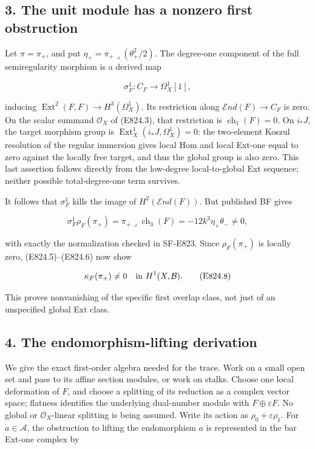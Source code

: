\subsection{3. The unit module has a nonzero first
obstruction}\label{SF-E824-the-unit-module-has-a-nonzero-first-obstruction}

Let \(\pi=\pi_+\), and put
\(\eta_+=\pi_+\mathbin{\lrcorner}(\theta_+^2/2)\). The degree-one
component of the full semiregularity morphism is a derived map

\[
 \sigma_F^1:C_F\longrightarrow\Omega_X^1[1],
\]

inducing \(\operatorname{Ext}^2(F,F)\to H^3(\Omega_X^1)\). Its
restriction along \(\mathcal E nd(F)\to C_F\) is zero. On the scalar
summand \(\mathcal O_X\) of (E824.3), that restriction is
\(\operatorname{ch}_1(F)=0\). On \(i_*J\), the target morphism group is
\(\operatorname{Ext}^1_X(i_*J,\Omega_X^1)=0\): the two-element Koszul
resolution of the regular immersion gives local Hom and local Ext-one
equal to zero against the locally free target, and thus the global group
is also zero. This last assertion follows directly from the low-degree
local-to-global Ext sequence; neither possible total-degree-one term
survives.

It follows that \(\sigma_F^1\) kills the image of
\(H^2(\mathcal E nd(F))\). But published BF gives

\[
 \sigma_F^1\rho_F(\pi_+)
    =\pi_+\mathbin{\lrcorner}\operatorname{ch}_3(F)
    =-12k^3\eta_+\theta_-\ne0,
 \tag{E824.7}
\]

with exactly the normalization checked in SF-E823. Since
\(\rho_F(\pi_+)\) is locally zero, (E824.5)--(E824.6) now show

\[
 \kappa_F(\pi_+)\ne0
       \quad\hbox{in }H^1(X,\mathcal B).
 \tag{E824.8}
\]

This proves nonvanishing of the specific first overlap class, not just
of an unspecified global Ext class.

\subsection{4. The endomorphism-lifting
derivation}\label{SF-E824-the-endomorphism-lifting-derivation}

We give the exact first-order algebra needed for the trace. Work on a
small open set and pass to its affine section modules, or work on
stalks. Choose one local deformation of \(F\), and choose a splitting of
its reduction as a complex vector space; flatness identifies the
underlying dual-number module with \(F\oplus\varepsilon F\). No global
or \(\mathcal O_X\)-linear splitting is being assumed. Write its action
as \(\rho_0+\varepsilon\rho_1\). For \(a\in\mathcal A\), the obstruction
to lifting the endomorphism \(a\) is represented in the bar Ext-one
complex by

